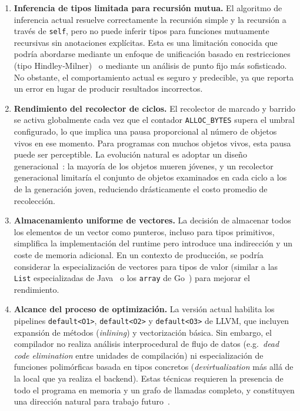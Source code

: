 \documentclass[12pt, a4paper]{article}
\begin{document}
\begin{enumerate}[leftmargin=1.4em, itemsep=0.35em]
	\item \textbf{Inferencia de tipos limitada para recursión mutua.} El algoritmo de inferencia actual resuelve correctamente la recursión simple y la recursión a través de \texttt{self}, pero no puede inferir tipos para funciones mutuamente recursivas sin anotaciones explícitas. Esta es una limitación conocida que podría abordarse mediante un enfoque de unificación basado en restricciones (tipo Hindley‑Milner)~\cite{milner1978} o mediante un análisis de punto fijo más sofisticado. No obstante, el comportamiento actual es seguro y predecible, ya que reporta un error en lugar de producir resultados incorrectos.
	
	\item \textbf{Rendimiento del recolector de ciclos.} El recolector de marcado y barrido se activa globalmente cada vez que el contador \texttt{ALLOC\_BYTES} supera el umbral configurado, lo que implica una pausa proporcional al número de objetos vivos en ese momento. Para programas con muchos objetos vivos, esta pausa puede ser perceptible. La evolución natural es adoptar un diseño generacional~\cite{baconrajan2001}: la mayoría de los objetos mueren jóvenes, y un recolector generacional limitaría el conjunto de objetos examinados en cada ciclo a los de la generación joven, reduciendo drásticamente el costo promedio de recolección.
	
	\item \textbf{Almacenamiento uniforme de vectores.} La decisión de almacenar todos los elementos de un vector como punteros, incluso para tipos primitivos, simplifica la implementación del runtime pero introduce una indirección y un coste de memoria adicional. En un contexto de producción, se podría considerar la especialización de vectores para tipos de valor (similar a las \texttt{List} especializadas de Java~\cite{gosling2021} o los \texttt{array} de Go~\cite{donovan2015}) para mejorar el rendimiento.

	\item \textbf{Alcance del proceso de optimización.} La versión actual habilita los pipelines \texttt{default<O1>}, \texttt{default<O2>} y \texttt{default<O3>} de LLVM, que incluyen expansión de métodos (\textit{inlining}) y vectorización básica. Sin embargo, el compilador no realiza análisis interprocedural de flujo de datos (e.g.\ \textit{dead code elimination} entre unidades de compilación) ni especialización de funciones polimórficas basada en tipos concretos (\textit{devirtualization} más allá de la local que ya realiza el backend). Estas técnicas requieren la presencia de todo el programa en memoria y un grafo de llamadas completo, y constituyen una dirección natural para trabajo futuro~\cite{allen2001}.
\end{enumerate}
\end{document}
